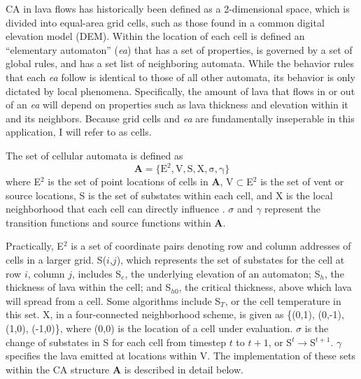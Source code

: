 CA in lava flows has historically been defined as a 2-dimensional space, which is divided into equal-area grid cells, such as those found in a common digital elevation model (DEM). Within the location of each cell is defined an ``elementary automaton'' (\textit{ea}) that has a set of properties, is governed by a set of global rules, and has a set list of neighboring automata. While the behavior rules that each \textit{ea} follow is identical to those of all other automata, its behavior is only dictated by local phenomena. Specifically, the amount of lava that flows in or out of an \textit{ea} will depend on properties such as lava thickness and elevation within it and its neighbors. Because grid cells and \textit{ea} are fundamentally inseperable in this application, I will refer to  as cells.

The set of cellular automata is defined as
	\begin{equation}
		\mathbf{A} = \mathrm{\{E^2, V, S, X, \sigma, \gamma\}}
	\end{equation}
	where E$^2$ is the set of point locations of cells in \textbf{A}, V$\subset$E$^2$ is the set of vent or source locations, S is the set of substates within each cell, and X is the local neighborhood that each cell can directly influence \citep{barca1994cellular}. $\sigma$ and $\gamma$ represent the transition functions and source functions within \textbf{A}. 
	
	Practically, E$^2$ is a set of coordinate pairs denoting row and column addresses of cells in a larger grid. S($i$,$j$), which represents the set of substates for the cell at row $i$, column $j$, includes S$_e$, the underlying elevation of an automaton; S$_h$, the thickness of lava within the cell; and S$_{h0}$, the critical thickness, above which lava will spread from a cell. Some algorithms include S$_T$, or the cell temperature in this set. X, in a four-connected neighborhood scheme, is given as \{(0,1), (0,-1), (1,0), (-1,0)\}, where (0,0) is the location of a cell under evaluation. $\sigma$ is the change of substates in S for each cell from timestep $t$ to $t+1$, or S$^{t}\rightarrow$S$^{t+1}$. $\gamma$ specifies the lava emitted at locations within V. The implementation of these sets within the CA structure \textbf{A} is described in detail below.
	
